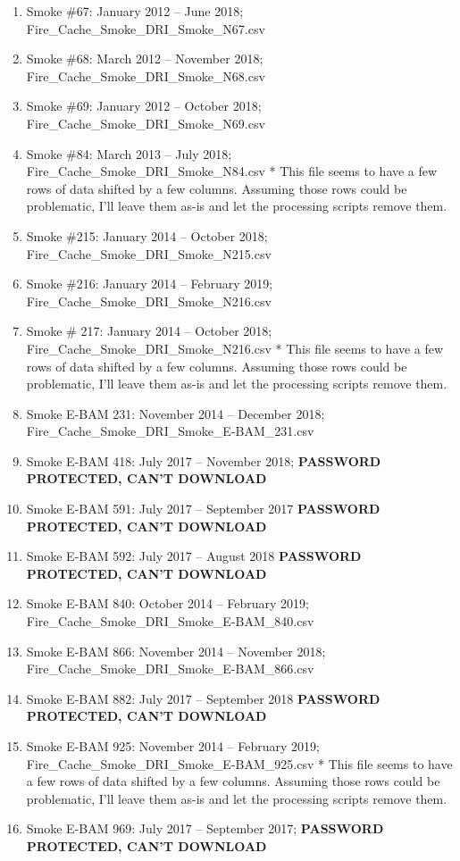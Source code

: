 \begin{enumerate}
\begin{enumerate}[nolistsep]
\item Smoke \#67: January 2012 -- June 2018; Fire\_Cache\_Smoke\_DRI\_Smoke\_N67.csv
\item Smoke \#68: March 2012 -- November 2018; Fire\_Cache\_Smoke\_DRI\_Smoke\_N68.csv
\item Smoke \#69: January 2012 -- October 2018; Fire\_Cache\_Smoke\_DRI\_Smoke\_N69.csv
\item Smoke \#84: March 2013 -- July 2018; Fire\_Cache\_Smoke\_DRI\_Smoke\_N84.csv * This file seems to have a few rows of data shifted by a few columns. Assuming those rows could be problematic, I'll leave them as-is and let the processing scripts remove them.
\item Smoke \#215: January 2014 -- October 2018; Fire\_Cache\_Smoke\_DRI\_Smoke\_N215.csv
\item Smoke \#216: January 2014 -- February 2019; Fire\_Cache\_Smoke\_DRI\_Smoke\_N216.csv
\item Smoke \# 217: January 2014 -- October 2018; Fire\_Cache\_Smoke\_DRI\_Smoke\_N216.csv * This file seems to have a few rows of data shifted by a few columns. Assuming those rows could be problematic, I'll leave them as-is and let the processing scripts remove them.
\item Smoke E-BAM 231: November 2014 -- December 2018; Fire\_Cache\_Smoke\_DRI\_Smoke\_E-BAM\_231.csv
\item Smoke E-BAM 418: July 2017 -- November 2018; \textbf{PASSWORD PROTECTED, CAN'T DOWNLOAD}
\item Smoke E-BAM 591: July 2017 -- September 2017  \textbf{PASSWORD PROTECTED, CAN'T DOWNLOAD}
\item Smoke E-BAM 592: July 2017 -- August 2018 \textbf{PASSWORD PROTECTED, CAN'T DOWNLOAD}
\item Smoke E-BAM 840: October 2014 -- February 2019; Fire\_Cache\_Smoke\_DRI\_Smoke\_E-BAM\_840.csv
\item Smoke E-BAM 866: November 2014 -- November 2018; Fire\_Cache\_Smoke\_DRI\_Smoke\_E-BAM\_866.csv
\item Smoke E-BAM 882: July 2017 -- September 2018  \textbf{PASSWORD PROTECTED, CAN'T DOWNLOAD}
\item Smoke E-BAM 925: November 2014 -- February 2019; Fire\_Cache\_Smoke\_DRI\_Smoke\_E-BAM\_925.csv * This file seems to have a few rows of data shifted by a few columns. Assuming those rows could be problematic, I'll leave them as-is and let the processing scripts remove them.
\item Smoke E-BAM 969: July 2017 -- September 2017;  \textbf{PASSWORD PROTECTED, CAN'T DOWNLOAD}
\end{enumerate}


\end{enumerate}
